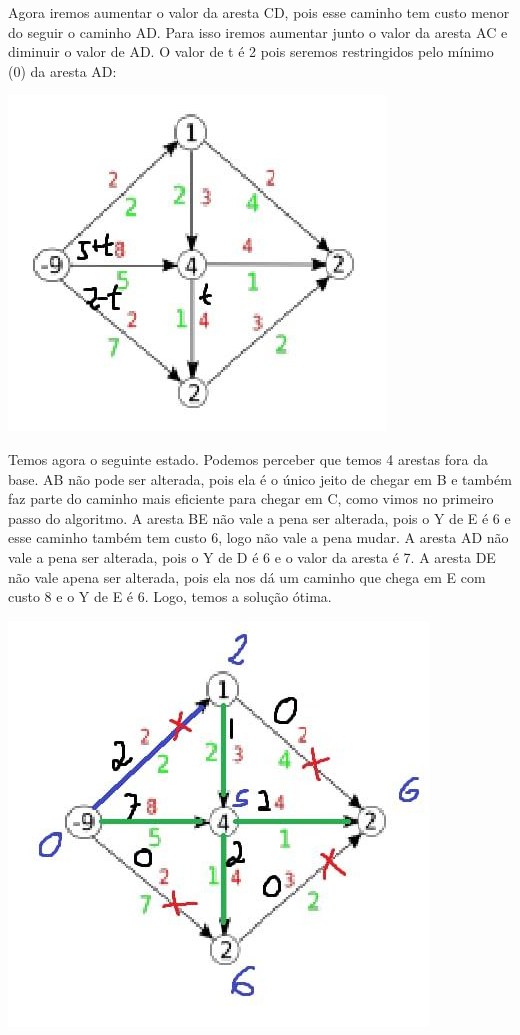 \documentclass[11pt]{article}
\begin{document}
\newpage
Agora iremos aumentar o valor da aresta CD, pois esse caminho tem custo menor do seguir o caminho AD. Para isso iremos aumentar junto o valor da aresta AC e diminuir o valor de AD. O valor de t é 2 pois seremos restringidos pelo mínimo (0) da aresta AD:
\begin{center}
\includegraphics[width=.9\linewidth]{14.jpg}
\end{center}

\newpage
Temos agora o seguinte estado. Podemos perceber que temos 4 arestas fora da base. AB não pode ser alterada, pois ela é o único jeito de chegar em B e também faz parte do caminho mais eficiente para chegar em C, como vimos no primeiro passo do algoritmo. A aresta BE não vale a pena ser alterada, pois o Y de E é 6 e esse caminho também tem custo 6, logo não vale a pena mudar. A aresta AD não vale a pena ser alterada, pois o Y de D é 6 e o valor da aresta é 7. A aresta DE não vale apena ser alterada, pois ela nos dá um caminho que chega em E com custo 8 e o Y de E é 6. Logo, temos a solução ótima.
\begin{center}
\includegraphics[width=.9\linewidth]{15.jpg}
\end{center}
\end{document}
